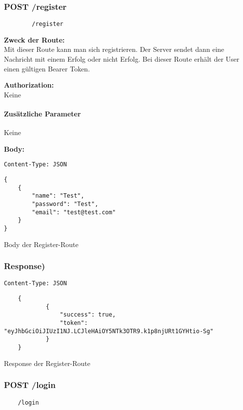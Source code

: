 
\subsubsection{POST /register}

\begin{lstlisting}
        /register
    \end{lstlisting}


\textbf{Zweck der Route:} \\
Mit dieser Route kann man sich registrieren. Der Server
sendet dann eine Nachricht mit einem Erfolg oder nicht Erfolg.
Bei dieser Route erhält der User einen gültigen Bearer Token.

\textbf{Authorization:} \\
Keine

\paragraph{Zusätzliche Parameter}
Keine

\textbf{Body:}
\begin{code}
    \lstinline{Content-Type: JSON}
    \begin{lstlisting}
{
    {
        "name": "Test",
        "password": "Test",
        "email": "test@test.com"
    }  
}
    \end{lstlisting}
    \caption{Body der Register-Route}
\end{code}

\subsubsection{Response)}

\begin{code}
    \lstinline{Content-Type: JSON}
    \begin{lstlisting}
    {
            {
                "success": true,
                "token": "eyJhbGciOiJIUzI1NJ.LCJleHAiOY5NTk3OTR9.k1p8njURt1GYHtio-Sg"
            }
    }
    \end{lstlisting}
    \caption{Response der Register-Route}
\end{code}

\pagebreak

\subsubsection{POST /login}

\begin{lstlisting}
    /login
\end{lstlisting}


